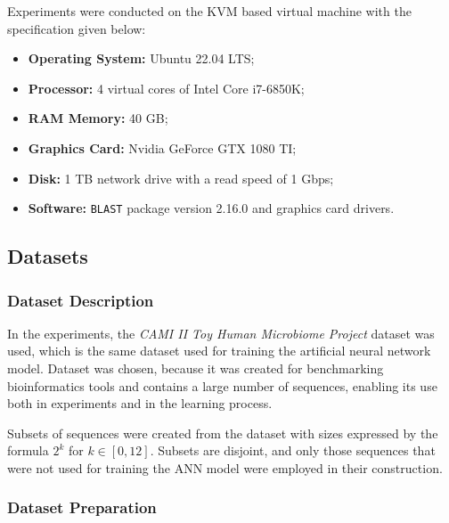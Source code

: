 \documentclass{article}
\begin{document}
            Experiments were conducted on the KVM based virtual machine with the specification given below:

            \begin{itemize}
                \item{
                    \textbf{Operating System:} Ubuntu 22.04 LTS;
                }
                \item{
                    \textbf{Processor:} 4 virtual cores of Intel Core i7-6850K;
                }
                \item{
                    \textbf{RAM Memory:} 40 GB;
                }
                \item{
                    \textbf{Graphics Card:} Nvidia GeForce GTX 1080 TI;
                }
                \item{
                    \textbf{Disk:} 1 TB network drive with a read speed of 1 Gbps;
                }
                \item{
                    \textbf{Software:} \texttt{BLAST} package version 2.16.0 and graphics card drivers.
                }
            \end{itemize}

        \subsection{Datasets}

            \subsubsection{Dataset Description}

                In the experiments, the \textit{CAMI II Toy Human Microbiome Project}\cite{Fritz:2019} dataset was used, which is the same dataset used for training the artificial neural network model. Dataset was chosen, because it was created for benchmarking bioinformatics tools and contains a large number of sequences, enabling its use both in experiments and in the learning process.

                Subsets of sequences were created from the dataset with sizes expressed by the formula $2^k$ for $k \in [0, 12]$. Subsets are disjoint, and only those sequences that were not used for training the ANN model were employed in their construction.

            \subsubsection{Dataset Preparation}
\end{document}
